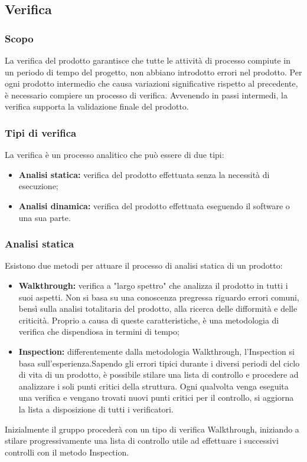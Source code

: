 \subsection{Verifica}
\subsubsection{Scopo}
La verifica del prodotto garantisce che tutte le attività di processo compiute in un periodo di tempo del progetto, non abbiano introdotto errori nel prodotto. Per ogni prodotto intermedio che causa variazioni significative rispetto al precedente, è necessario compiere un processo di verifica. Avvenendo in passi intermedi, la verifica supporta la validazione finale del prodotto.

\subsubsection{Tipi di verifica}
La verifica è un processo analitico che può essere di due tipi:
\begin{itemize}
	\item \textbf{Analisi statica:} verifica del prodotto effettuata senza la necessità di esecuzione; 
	\item \textbf{Analisi dinamica:} verifica del prodotto effettuata eseguendo il software o una sua parte.
\end{itemize}

\subsubsection{Analisi statica}
\noindent Esistono due metodi per attuare il processo di analisi statica di un prodotto:
\begin{itemize}
	\item \textbf{Walkthrough:} verifica a "largo spettro" che analizza il prodotto in tutti i suoi aspetti. Non si basa su una conoscenza pregressa riguardo errori comuni, bensì sulla analisi totalitaria del prodotto, alla ricerca delle difformità e delle criticità. Proprio a causa di queste caratteristiche, è una metodologia di verifica che dispendiosa in termini di tempo;
	\item \textbf{Inspection:} differentemente dalla metodologia Walkthrough, l'Inspection si basa sull'esperienza.Sapendo gli errori tipici durante i diversi periodi del ciclo di vita di un prodotto, è possibile stilare una lista di controllo e procedere ad analizzare i soli punti critici della struttura. Ogni qualvolta venga eseguita una verifica e vengano trovati nuovi punti critici per il controllo, si aggiorna la lista a disposizione di tutti i verificatori.
\end{itemize}
Inizialmente il gruppo procederà con un tipo di verifica Walkthrough, iniziando a stilare progressivamente una lista di controllo utile ad effettuare i successivi controlli con il metodo Inspection.\\

